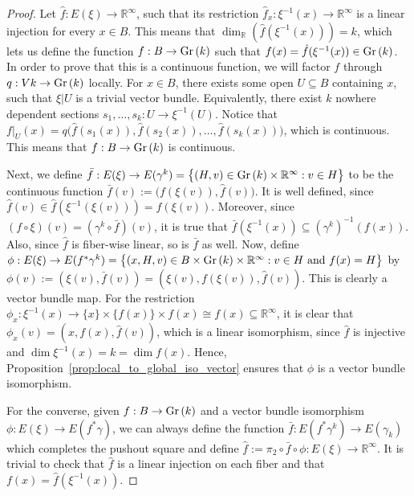 \begin{proof} Let $\hat{f}:E(\xi)\to\mathbb{R}^{\infty}$, such that its restriction $\hat{f}_x:\xi^{-1}(x)\to\mathbb{R}^{\infty}$ is a linear injection for every $x\in B$. This means that $\dim_{\mathbb{R}}(\hat{f}(\xi^{-1}(x)))=k$, which lets us define the function $f:B\to\Gr{k}$ such that $f(x)=\hat{f}(\xi^{-1}(x))\in\Gr{k}$. In order to prove that this is a continuous function, we will factor $f$ through $q:V{k}\to\Gr{k}$ locally. For $x\in B$, there exists some open $U\subseteq B$ containing $x$, such that $\xi|U$ is a trivial vector bundle. Equivalently, there exist $k$ nowhere dependent sections $s_1,\ldots,s_k:U\to\xi^{-1}(U)$. Notice that $f|_U(x)=q\big(\hat{f}(s_1(x)),\hat{f}(s_2(x)),\ldots,\hat{f}(s_k(x))\big)$, which is continuous. This means that $f:B\to\Gr{k}$ is continuous.

Next, we define $\bar{f}:E(\xi)\to E(\gamma^k)=\big\{(H,v)\in\Gr{k}\times\mathbb{R}^{\infty}:v\in H\big\}$ to be the continuous function $\bar{f}(v):=\big(f(\xi(v)),\hat{f}(v)\big)$. It is well defined, since $\hat{f}(v)\in\hat{f}(\xi^{-1}(\xi(v)))=f(\xi(v))$. Moreover, since $(f\circ\xi)(v)=(\gamma^k\circ\bar{f})(v)$, it is true that $\bar{f}(\xi^{-1}(x))\subseteq(\gamma^k)^{-1}(f(x))$. Also, since $\hat{f}$ is fiber-wise linear, so is $\bar{f}$ as well. Now, define $\phi:E(\xi)\to E(f^*\gamma^k)=\big\{(x,H,v)\in B\times\Gr{k}\times\mathbb{R}^{\infty}:v\in H\text{ and }f(x)=H\big\}$ by $\phi(v):=(\xi(v),\bar{f}(v))=(\xi(v),f(\xi(v)),\hat{f}(v))$. This is clearly a vector bundle map. For the restriction $\phi_x:\xi^{-1}(x)\to\{x\}\times\{f(x)\}\times f(x)\cong f(x)\subseteq\mathbb{R}^{\infty}$, it is clear that $\phi_x(v)=(x,f(x),\hat{f}(v))$, which is a linear isomorphism, since $\hat{f}$ is injective and $\dim\xi^{-1}(x)=k=\dim f(x)$. Hence, Proposition~\ref{prop:local_to_global_iso_vector} ensures that $\phi$ is a vector bundle isomorphism.

For the converse, given $f:B\to\Gr{k}$ and a vector bundle isomorphism $\phi:E(\xi)\to E(f^*\gamma)$, we can always define the function $\bar{f}:E(f^*\gamma^k)\to E(\gamma_k)$ which completes the pushout square and define $\hat{f}:=\pi_2\circ\bar{f}\circ\phi:E(\xi)\to\mathbb{R}^{\infty}$. It is trivial to check that $\hat{f}$ is a linear injection on each fiber and that $f(x)=\hat{f}(\xi^{-1}(x))$.
\end{proof}

